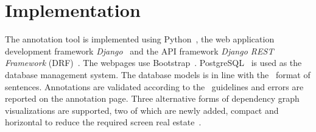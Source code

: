 \section{Implementation}
\label{sec:implementation}


The annotation tool is implemented using Python~\cite{python}, the web application development framework \textit{Django}~\cite{django} and the API framework \textit{Django REST Framework} (DRF)~\cite{drf}.
The webpages use Bootstrap~\cite{bootstrap}.
PostgreSQL~\cite{psql} is used as the database management system.
The database models is in line with the \ud\ format of sentences.
Annotations are validated according to the \ud\ guidelines and errors are reported on the annotation page.
Three alternative forms of dependency graph visualizations are supported, two of which are newly added, compact and horizontal to reduce the required screen real estate~\cite{spacy,spyssalo}.

